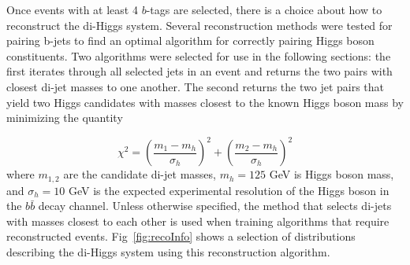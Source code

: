 Once events with at least 4 $b$-tags are selected, there is a choice about how to reconstruct the di-Higgs system. Several reconstruction methods were tested for pairing b-jets to find an optimal algorithm for correctly pairing Higgs boson constituents. Two algorithms were selected for use in the following sections: the first iterates through all selected jets in an event and returns the two pairs with closest di-jet masses to one another. The second returns the two jet pairs that yield two Higgs candidates with masses closest to the known Higgs boson mass by minimizing the quantity 

\begin{equation*}
\chi^2 = \left ( \frac{m_1 - m_h}{\sigma_h} \right ) ^2 + \left ( \frac{m_2 - m_h}{\sigma_h} \right ) ^2
\end{equation*}
where $m_{1,2}$ are the candidate di-jet masses, $m_h=125$ GeV is Higgs boson mass, and $\sigma_h =10$ GeV is the expected experimental resolution of the Higgs boson in the $b\bar{b}$ decay channel. Unless otherwise specified, the method that selects di-jets with masses closest to each other is used when training algorithms that require reconstructed events. Fig~\ref{fig:recoInfo} shows a selection of distributions describing the di-Higgs system using this reconstruction algorithm.

